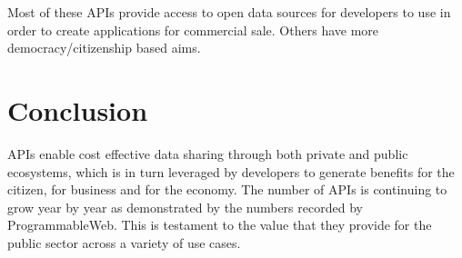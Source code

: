Most of these APIs provide access to open data sources for developers to use in
order to create applications for commercial sale. Others have more
democracy/citizenship based aims.

\section{Conclusion}

APIs enable cost effective data sharing through both private and public
ecosystems, which is in turn leveraged by developers to generate benefits for
the citizen, for business and for the economy. The number of APIs is continuing
to grow year by year as demonstrated by the numbers recorded by ProgrammableWeb.
This is testament to the value that they provide for the public sector across a
variety of use cases.
